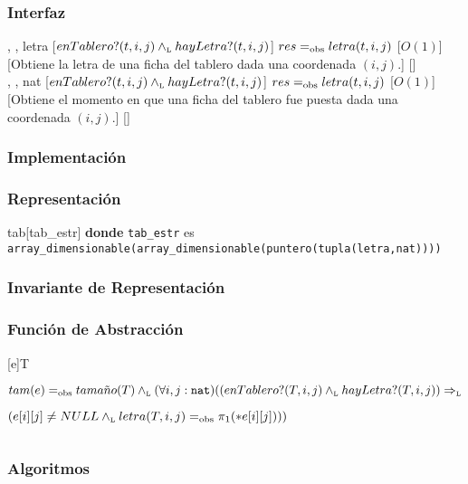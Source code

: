\begin{interfaz}{\subsubsection{Interfaz}}
\begin{operaciones}
    \noindent{}
    {, , }{letra}
    [$enTablero?(t,i,j)\land_{\mathrm{\scriptscriptstyle{L}}} hayLetra?(t,i,j)$]
    {$res=_{\mathrm{obs}} letra(t,i,j)$}
    [$O(1)$]
    [Obtiene la letra de una ficha del tablero dada una coordenada $(i,j)$.]
    [\falta]\\

    \noindent{}
    {, , }{nat}
    [$enTablero?(t,i,j)\land_{\mathrm{\scriptscriptstyle{L}}} hayLetra?(t,i,j)$]
    {$res=_{\mathrm{obs}} letra(t,i,j)$}
    [$O(1)$]
    [Obtiene el momento en que una ficha del tablero fue puesta dada una coordenada $(i,j)$.]
    [\falta]
  \end{operaciones}
\end{interfaz}
\subsubsection{Implementación}
\subsubsection*{Representación}
\begin{Estructura}{tab}[tab\_estr]
  \textbf{donde} \texttt{tab\_estr} es \texttt{array\_dimensionable(array\_dimensionable(puntero(tupla(letra,nat))))}
\end{Estructura}
\subsubsection*{Invariante de Representación}

\subsubsection*{Función de Abstracción}
[e]{T}{
  $
  tam(e)=_{\mathrm{obs}} tama\tilde{n}o(T)\land_{\mathrm{\scriptscriptstyle{L}}}\\
  (\forall i,j:\texttt{nat})((enTablero?(T,i,j)\land_{\mathrm{\scriptscriptstyle{L}}} hayLetra?(T,i,j))\Rightarrow_{\mathrm{\scriptscriptstyle{L}}}
  $\begin{adjustwidth}{12em}{0em}$
  (e[i][j]\neq NULL\land_{\mathrm{\scriptscriptstyle{L}}} letra(T,i,j)=_{\mathrm{obs}}\pi_{1}(*e[i][j])))
  $\end{adjustwidth}$
  $
}

\subsubsection*{Algoritmos}
\begin{algorithm}[H]
  \begin{algorithmic}[1]
    \State{}
        \State{}
          \State{}
        \EndFor
    \EndFor
    \State{}
  \end{algorithmic}
\end{algorithm}

